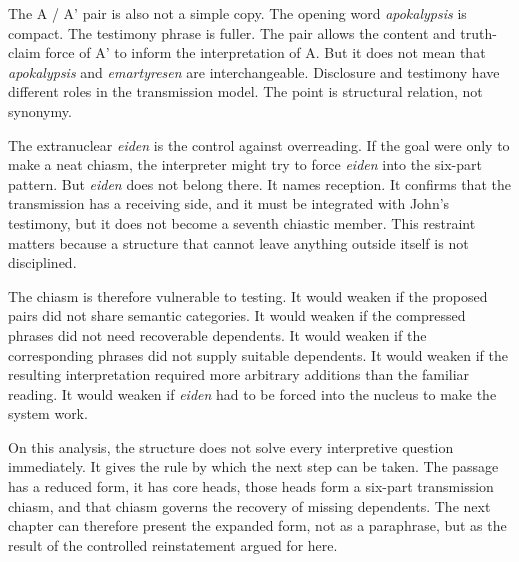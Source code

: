 The A / A' pair is also not a simple copy. The opening word \textit{apokalypsis} is compact. The testimony phrase is fuller. The pair allows the content and truth-claim force of A' to inform the interpretation of A. But it does not mean that \textit{apokalypsis} and \textit{emartyresen} are interchangeable. Disclosure and testimony have different roles in the transmission model. The point is structural relation, not synonymy.

The extranuclear \textit{eiden} is the control against overreading. If the goal were only to make a neat chiasm, the interpreter might try to force \textit{eiden} into the six-part pattern. But \textit{eiden} does not belong there. It names reception. It confirms that the transmission has a receiving side, and it must be integrated with John's testimony, but it does not become a seventh chiastic member. This restraint matters because a structure that cannot leave anything outside itself is not disciplined.

The chiasm is therefore vulnerable to testing. It would weaken if the proposed pairs did not share semantic categories. It would weaken if the compressed phrases did not need recoverable dependents. It would weaken if the corresponding phrases did not supply suitable dependents. It would weaken if the resulting interpretation required more arbitrary additions than the familiar reading. It would weaken if \textit{eiden} had to be forced into the nucleus to make the system work.

On this analysis, the structure does not solve every interpretive question immediately. It gives the rule by which the next step can be taken. The passage has a reduced form, it has core heads, those heads form a six-part transmission chiasm, and that chiasm governs the recovery of missing dependents. The next chapter can therefore present the expanded form, not as a paraphrase, but as the result of the controlled reinstatement argued for here.
